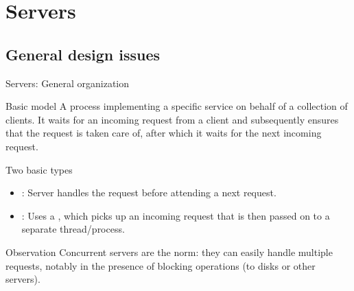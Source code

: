 \section{Servers}
\subsection{General design issues}
\begin{slide}{Servers: General organization}
  \begin{block}{Basic model} 
    A process implementing a specific service on behalf of a collection of clients. It waits for an incoming
    request from a client and subsequently ensures that the request is taken care of, after which it waits for
    the next incoming request.
  \end{block}
  \onslide
  \begin{block}{Two basic types}
    \begin{itemize}
    \item {}: Server handles the request before attending a next request.
    \item {}: Uses a , which picks up an incoming request that is then
      passed on to a separate thread/process.
    \end{itemize}
  \end{block}
  \begin{alertblock}{Observation}
    Concurrent servers are the norm: they can easily handle multiple requests, notably in the presence of
    blocking operations (to disks or other servers).
  \end{alertblock}
\end{slide}
